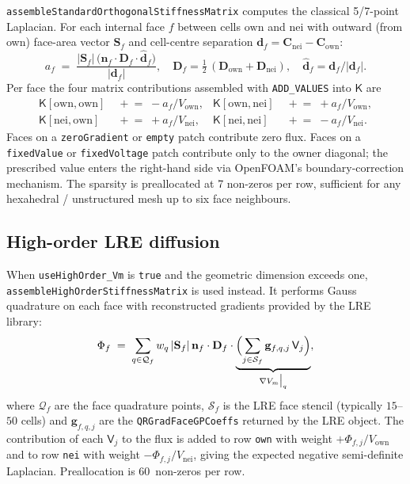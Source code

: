 \documentclass[11pt,a4paper]{article}
\newcommand{\Vm}{V_{m}}
\newcommand{\Dten}{\mathbf{D}}
\newcommand{\grad}{\nabla}
\newcommand{\Kstif}{\mathsf{K}}
\newcommand{\code}[1]{\texttt{\small #1}}
\begin{document}
\code{assembleStandardOrthogonalStiffnessMatrix} computes the
classical 5/7-point Laplacian. For each internal face $f$ between cells
$\text{own}$ and $\text{nei}$ with outward (from own) face-area vector
$\mathbf{S}_{f}$ and cell-centre separation $\mathbf{d}_{f} =
\mathbf{C}_{\text{nei}} - \mathbf{C}_{\text{own}}$:
\begin{equation}
  a_{f} \;=\;
   \frac{ \lvert \mathbf{S}_{f} \rvert\,
          \bigl( \mathbf{n}_{f} \cdot \Dten_{f} \cdot \hat{\mathbf{d}}_{f} \bigr) }
        { \lvert \mathbf{d}_{f} \rvert },
   \quad
   \Dten_{f} = \tfrac{1}{2}\,(\Dten_{\text{own}} + \Dten_{\text{nei}}),
   \quad
   \hat{\mathbf{d}}_{f} = \mathbf{d}_{f}/\lvert \mathbf{d}_{f} \rvert.
\end{equation}
Per face the four matrix contributions assembled with \code{ADD\_VALUES}
into $\Kstif$ are
\begin{equation}
\begin{aligned}
  \Kstif[\text{own},\text{own}] &\;\mathrel{+}=\; -a_{f}/V_{\text{own}}, &
  \Kstif[\text{own},\text{nei}] &\;\mathrel{+}=\; +a_{f}/V_{\text{own}}, \\
  \Kstif[\text{nei},\text{own}] &\;\mathrel{+}=\; +a_{f}/V_{\text{nei}}, &
  \Kstif[\text{nei},\text{nei}] &\;\mathrel{+}=\; -a_{f}/V_{\text{nei}}.
\end{aligned}
\end{equation}
Faces on a \code{zeroGradient} or \code{empty} patch contribute zero
flux. Faces on a \code{fixedValue} or \code{fixedVoltage} patch
contribute only to the owner diagonal; the prescribed value enters the
right-hand side via OpenFOAM's boundary-correction mechanism. The
sparsity is preallocated at 7 non-zeros per row, sufficient for any
hexahedral / unstructured mesh up to six face neighbours.

\subsection{High-order LRE diffusion}

When \code{useHighOrder\_Vm} is \code{true} and the geometric dimension
exceeds one, \code{assembleHighOrderStiffnessMatrix} is used instead.
It performs Gauss quadrature on each face with reconstructed gradients
provided by the LRE library:
\begin{equation}
  \Phi_{f} \;=\;
   \sum_{q \in \mathcal{Q}_{f}}
       w_{q}\, \lvert \mathbf{S}_{f} \rvert\,
       \mathbf{n}_{f} \cdot \Dten_{f} \cdot
       \underbrace{\Bigl(
         \sum_{j \in \mathcal{S}_{f}}
            \mathbf{g}_{f,q,j}\, \mathsf{V}_{j}
       \Bigr)}_{\grad \Vm \big|_{q}},
   \label{eq:HO-flux}
\end{equation}
where $\mathcal{Q}_{f}$ are the face quadrature points,
$\mathcal{S}_{f}$ is the LRE face stencil (typically $15$--$50$ cells)
and $\mathbf{g}_{f,q,j}$ are the \code{QRGradFaceGPCoeffs} returned by
the LRE object. The contribution of each $\mathsf{V}_{j}$ to the flux
is added to row \code{own} with weight $+\Phi_{f,j}/V_{\text{own}}$
and to row \code{nei} with weight $-\Phi_{f,j}/V_{\text{nei}}$, giving
the expected negative semi-definite Laplacian. Preallocation is
60~non-zeros per row.
\end{document}
